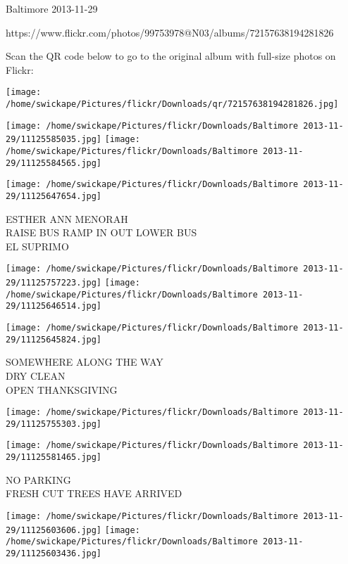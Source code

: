 \documentclass[10pt,letterpaper]{article}
\begin{document}
Baltimore 2013-11-29

https://www.flickr.com/photos/99753978@N03/albums/72157638194281826

Scan the QR code below to go to the original album with full-size photos on Flickr:

\texttt{[image: /home/swickape/Pictures/flickr/Downloads/qr/72157638194281826.jpg]}
\pagebreak

\texttt{[image: /home/swickape/Pictures/flickr/Downloads/Baltimore 2013-11-29/11125585035.jpg]}
\texttt{[image: /home/swickape/Pictures/flickr/Downloads/Baltimore 2013-11-29/11125584565.jpg]}

\vspace{0.25in}
\texttt{[image: /home/swickape/Pictures/flickr/Downloads/Baltimore 2013-11-29/11125647654.jpg]}

ESTHER ANN MENORAH\\
RAISE BUS RAMP IN OUT LOWER BUS\\
EL SUPRIMO\\
\pagebreak

\texttt{[image: /home/swickape/Pictures/flickr/Downloads/Baltimore 2013-11-29/11125757223.jpg]}
\texttt{[image: /home/swickape/Pictures/flickr/Downloads/Baltimore 2013-11-29/11125646514.jpg]}

\vspace{0.25in}
\texttt{[image: /home/swickape/Pictures/flickr/Downloads/Baltimore 2013-11-29/11125645824.jpg]}

SOMEWHERE ALONG THE WAY\\
DRY CLEAN\\
OPEN THANKSGIVING\\
\pagebreak

\texttt{[image: /home/swickape/Pictures/flickr/Downloads/Baltimore 2013-11-29/11125755303.jpg]}

\vspace{0.25in}
\texttt{[image: /home/swickape/Pictures/flickr/Downloads/Baltimore 2013-11-29/11125581465.jpg]}

NO PARKING\\
FRESH CUT TREES HAVE ARRIVED\\
\pagebreak

\texttt{[image: /home/swickape/Pictures/flickr/Downloads/Baltimore 2013-11-29/11125603606.jpg]}
\texttt{[image: /home/swickape/Pictures/flickr/Downloads/Baltimore 2013-11-29/11125603436.jpg]}
\end{document}
